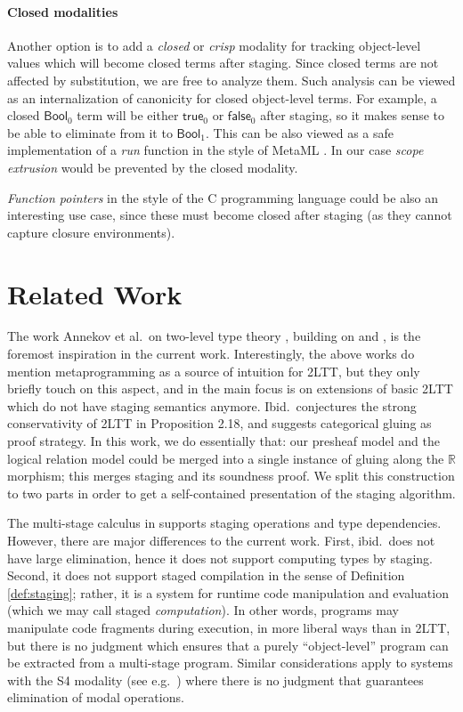 \documentclass[acmsmall,screen]{acmart}
\newcommand{\msf}[1]{\mathsf{#1}}
\newcommand{\mbb}[1]{\mathbb{#1}}
\newcommand{\Bool}{\msf{Bool}}
\newcommand{\true}{\msf{true}}
\newcommand{\false}{\msf{false}}
\newcommand{\re}{\mbb{R}}
\theoremstyle{remark}
\begin{document}
\paragraph{Closed modalities}\label{sec:closed-modalities}
Another option is to add a \emph{closed} or \emph{crisp} modality
\cite{licata2018internal} for tracking object-level values which will become
closed terms after staging. Since closed terms are not affected by substitution,
we are free to analyze them. Such analysis can be viewed as an internalization
of canonicity for closed object-level terms. For example, a closed $\Bool_0$
term will be either $\true_0$ or $\false_0$ after staging, so it makes sense to
be able to eliminate from it to $\Bool_1$. This can be also viewed as a safe
implementation of a \emph{run} function in the style of MetaML \cite{metaml}.
In our case \emph{scope extrusion} would be prevented by the closed modality.

\emph{Function pointers} in the style of the C programming language could be also
an interesting use case, since these must become closed after staging (as they
cannot capture closure environments).

\section{Related Work}\label{sec:related-work}

The work Annekov et al.\ on two-level type theory \cite{twolevel}, building on
\cite{capriotti2017models} and \cite{hts}, is the foremost inspiration in
the current work. Interestingly, the above works do mention metaprogramming as a
source of intuition for 2LTT, but they only briefly touch on this aspect, and in
\cite{twolevel} the main focus is on extensions of basic 2LTT which do not have
staging semantics anymore. Ibid.\ conjectures the strong conservativity of 2LTT
in Proposition 2.18, and suggests categorical gluing as proof strategy. In this
work, we do essentially that: our presheaf model and the logical relation model
could be merged into a single instance of gluing along the $\re$ morphism; this
merges staging and its soundness proof. We split this construction to two parts
in order to get a self-contained presentation of the staging algorithm.

The multi-stage calculus in \cite{multi-stage-calculus} supports staging
operations and type dependencies. However, there are major differences to the
current work. First, ibid.\ does not have large elimination, hence it does not
support computing types by staging. Second, it does not support staged
compilation in the sense of Definition \ref{def:staging}; rather, it is a system
for runtime code manipulation and evaluation (which we may call staged
\emph{computation}). In other words, programs may manipulate code fragments
during execution, in more liberal ways than in 2LTT, but there is no judgment
which ensures that a purely ``object-level'' program can be extracted from a
multi-stage program. Similar considerations apply to systems with the S4
modality (see e.g.\ \cite{DBLP:journals/jacm/DaviesP01}) where there is no
judgment that guarantees elimination of modal operations.
\end{document}
